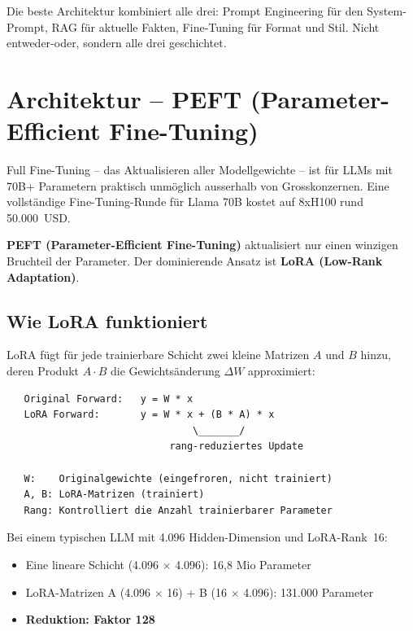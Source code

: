 \begin{praxishinweis}
Die beste Architektur kombiniert alle drei: Prompt Engineering für den System-Prompt, RAG für aktuelle Fakten, Fine-Tuning für Format und Stil. Nicht entweder-oder, sondern alle drei geschichtet.
\end{praxishinweis}

\section{Architektur -- PEFT (Parameter-Efficient Fine-Tuning)}

Full Fine-Tuning -- das Aktualisieren aller Modellgewichte -- ist für LLMs mit 70B+ Parametern praktisch unmöglich ausserhalb von Grosskonzernen. Eine vollständige Fine-Tuning-Runde für Llama 70B kostet auf 8xH100 rund 50.000~USD.

\textbf{PEFT (Parameter-Efficient Fine-Tuning)} aktualisiert nur einen winzigen Bruchteil der Parameter. Der dominierende Ansatz ist \textbf{LoRA (Low-Rank Adaptation)}.

\subsection{Wie LoRA funktioniert}

LoRA fügt für jede trainierbare Schicht zwei kleine Matrizen $A$ und $B$ hinzu, deren Produkt $A \cdot B$ die Gewichtsänderung $\Delta W$ approximiert:

\begin{verbatim}
   Original Forward:   y = W * x
   LoRA Forward:       y = W * x + (B * A) * x
                                \_______/
                            rang-reduziertes Update

   W:    Originalgewichte (eingefroren, nicht trainiert)
   A, B: LoRA-Matrizen (trainiert)
   Rang: Kontrolliert die Anzahl trainierbarer Parameter
\end{verbatim}

Bei einem typischen LLM mit 4.096 Hidden-Dimension und LoRA-Rank~16:

\begin{itemize}[leftmargin=*]
    \item Eine lineare Schicht (4.096 $\times$ 4.096): 16,8 Mio Parameter
    \item LoRA-Matrizen A (4.096 $\times$ 16) + B (16 $\times$ 4.096): 131.000 Parameter
    \item \textbf{Reduktion: Faktor 128}
\end{itemize}

